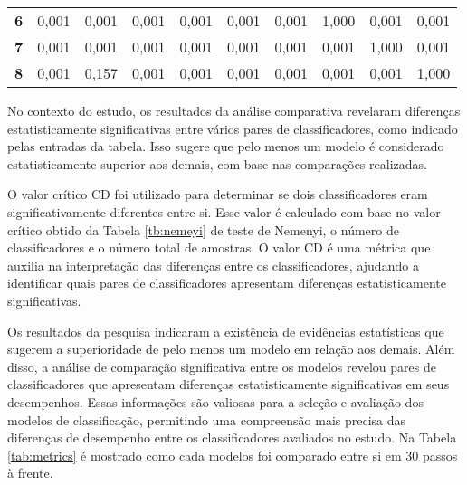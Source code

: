 \begin{table}[!htb]
\begin{tabular}{@{}clllllllll@{}}
		\textbf{6}                           & 0,001                          & 0,001                          & 0,001                          & 0,001                          & 0,001                          & 0,001                          & 1,000                          & 0,001                          & 0,001                          \\
		\textbf{7}                           & 0,001                          & 0,001                          & 0,001                          & 0,001                          & 0,001                          & 0,001                          & 0,001                          & 1,000                          & 0,001                          \\
		\textbf{8}                           & 0,001                          & 0,157                          & 0,001                          & 0,001                          & 0,001                          & 0,001                          & 0,001                          & 0,001                          & 1,000                          \\ \bottomrule
	\end{tabular}
	

\end{table}


No contexto do estudo, os resultados da análise comparativa revelaram diferenças estatisticamente significativas entre vários pares de classificadores, como indicado pelas entradas da tabela. Isso sugere que pelo menos um modelo é considerado estatisticamente superior aos demais, com base nas comparações realizadas.

O valor crítico CD foi utilizado para determinar se dois classificadores eram significativamente diferentes entre si. Esse valor é calculado com base no valor crítico obtido da Tabela \ref{tb:nemeyi} de teste de Nemenyi, o número de classificadores e o número total de amostras. O valor CD é uma métrica que auxilia na interpretação das diferenças entre os classificadores, ajudando a identificar quais pares de classificadores apresentam diferenças estatisticamente significativas.

Os resultados da pesquisa indicaram a existência de evidências estatísticas que sugerem a superioridade de pelo menos um modelo em relação aos demais. Além disso, a análise de comparação significativa entre os modelos revelou pares de classificadores que apresentam diferenças estatisticamente significativas em seus desempenhos. Essas informações são valiosas para a seleção e avaliação dos modelos de classificação, permitindo uma compreensão mais precisa das diferenças de desempenho entre os classificadores avaliados no estudo. Na Tabela \ref{tab:metrics} é mostrado como cada modelos foi comparado entre si em 30 passos à frente.

